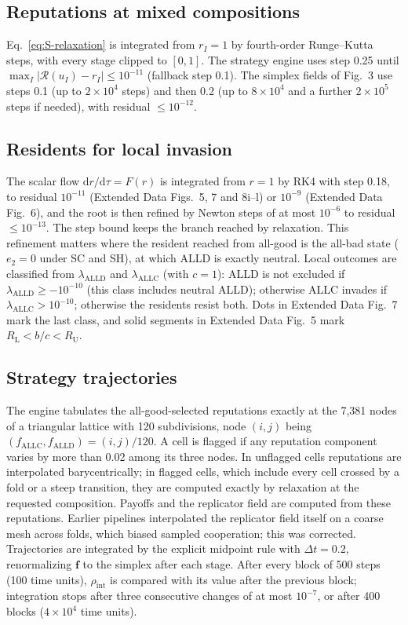 \documentclass[fleqn,10pt]{article}
\theoremstyle{plain}
\theoremstyle{remark}
\newcommand{\FigStrategy}{3}
\newcommand{\EDRatio}{5}
\newcommand{\EDErrors}{6}
\newcommand{\EDDepth}{7}
\newcommand{\EDReadout}{8}
\newcommand{\Rm}{\mathcal R}
\newcommand{\ALLC}{\mathrm{ALLC}}
\newcommand{\ALLD}{\mathrm{ALLD}}
\begin{document}
\subsection{Reputations at mixed compositions}
Eq.~\eqref{eq:S-relaxation} is integrated from $r_I=1$ by fourth-order
Runge--Kutta steps, with every stage clipped to $[0,1]$. The strategy engine
uses step 0.25 until $\max_I|\Rm(u_I)-r_I|\le10^{-11}$ (fallback step 0.1). The
simplex fields of Fig.~\FigStrategy{} use steps 0.1 (up to $2\times10^4$ steps)
and then 0.2 (up to $8\times10^4$ and a further $2\times10^5$ steps if needed),
with residual $\le10^{-12}$.

\subsection{Residents for local invasion}
The scalar flow $\mathrm dr/\mathrm d\tau=F(r)$ is integrated from $r=1$ by RK4
with step 0.18, to residual $10^{-11}$ (Extended Data Figs.~\EDRatio,
\EDDepth{} and \EDReadout i--l) or $10^{-9}$ (Extended Data Fig.~\EDErrors), and
the root is then refined by Newton steps of at most $10^{-6}$ to residual
$\le10^{-13}$. The step bound keeps the branch reached by relaxation. This
refinement matters where the resident reached from all-good is the all-bad
state ($e_2=0$ under SC and SH), at which ALLD is exactly neutral. Local outcomes
are classified from $\lambda_{\ALLD}$ and $\lambda_{\ALLC}$ (with $c=1$): ALLD is
not excluded if $\lambda_{\ALLD}\ge-10^{-10}$ (this class includes neutral
ALLD); otherwise ALLC invades if $\lambda_{\ALLC}>10^{-10}$; otherwise the
residents resist both. Dots in Extended Data Fig.~\EDDepth{} mark the last class,
and solid segments in Extended Data Fig.~\EDRatio{} mark
$R_{\mathrm L}<b/c<R_{\mathrm U}$.

\subsection{Strategy trajectories}
The engine tabulates the all-good-selected reputations exactly at the 7,381
nodes of a triangular lattice with 120 subdivisions, node $(i,j)$ being
$(f_{\ALLC},f_{\ALLD})=(i,j)/120$. A cell is flagged if any reputation component
varies by more than 0.02 among its three nodes. In unflagged cells reputations
are interpolated barycentrically; in flagged cells, which include every cell
crossed by a fold or a steep transition, they are computed exactly by relaxation
at the requested composition. Payoffs and the replicator field are computed from
these reputations. Earlier pipelines interpolated the replicator field itself
on a coarse mesh across folds, which biased sampled cooperation; this was
corrected. Trajectories are integrated by the explicit midpoint rule with
$\Delta t=0.2$, renormalizing $\boldsymbol f$ to the simplex after each stage. After
every block of 500 steps (100 time units), $\rho_{\mathrm{int}}$ is compared with
its value after the previous block; integration stops after three consecutive
changes of at most $10^{-7}$, or after 400 blocks ($4\times10^4$ time units).
\end{document}
